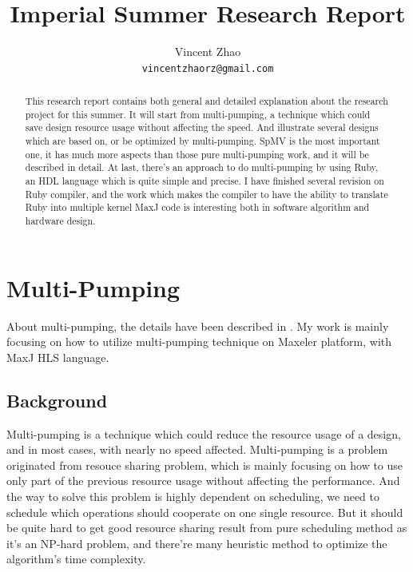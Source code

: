 \documentclass[a4paper, 10pt]{report}
\begin{document}
\title{Imperial Summer Research Report}
\author{Vincent Zhao\\
		\texttt{vincentzhaorz@gmail.com}}
\maketitle

\begin{abstract}
This research report contains both general and detailed explanation about the research project for this summer. It will start from multi-pumping, a technique which could save design resource usage without affecting the speed. And illustrate several designs which are based on, or be optimized by multi-pumping. SpMV is the most important one, it has much more aspects than those pure multi-pumping work, and it will be described in detail. At last, there's an approach to do multi-pumping by using Ruby, an HDL language which is quite simple and precise. I have finished several revision on Ruby compiler, and the work which makes the compiler to have the ability to translate Ruby into multiple kernel MaxJ code is interesting both in software algorithm and hardware design.
\end{abstract}
\newpage

\tableofcontents

\chapter{Multi-Pumping}

About multi-pumping, the details have been described in \cite{Canis:2013}. My work is mainly focusing on how to utilize multi-pumping technique on Maxeler platform, with MaxJ HLS language. 

\section{Background} 
Multi-pumping is a technique which could reduce the resource usage of a design, and in most cases, with nearly no speed affected. Multi-pumping is a problem originated from resouce sharing problem, which is mainly focusing on how to use only part of the previous resource usage without affecting the performance. And the way to solve this problem is highly dependent on scheduling, we need to schedule which operations should cooperate on one single resource. But it should be quite hard to get good resource sharing result from pure scheduling method as it's an NP-hard problem, and there're many heuristic method to optimize the algorithm's time complexity. 
\end{document}
